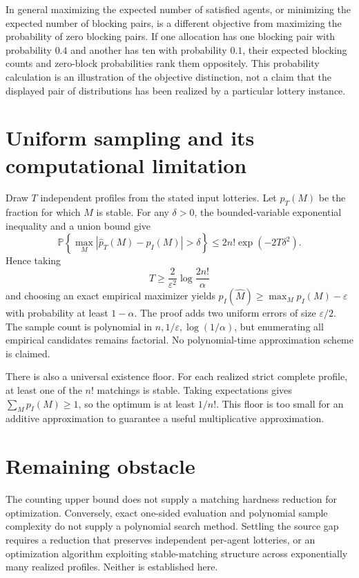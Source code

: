 \documentclass[11pt]{article}
\newcommand{\Prb}{\mathbb P}
\begin{document}
In general maximizing the expected number of satisfied agents, or minimizing the expected number of blocking pairs, is a different objective from maximizing the probability of zero blocking pairs. If one allocation has one blocking pair with probability $0.4$ and another has ten with probability $0.1$, their expected blocking counts and zero-block probabilities rank them oppositely. This probability calculation is an illustration of the objective distinction, not a claim that the displayed pair of distributions has been realized by a particular lottery instance.

\section*{Uniform sampling and its computational limitation}
Draw $T$ independent profiles from the stated input lotteries. Let $\widehat p_T(M)$ be the fraction for which $M$ is stable. For any $\delta>0$, the bounded-variable exponential inequality and a union bound give
\[
 \Prb\left\{\max_M|\widehat p_T(M)-p_I(M)|>\delta\right\}
 \leq2n!\exp(-2T\delta^2).
\]
Hence taking
\[
 T\geq \frac{2}{\varepsilon^2}\log\frac{2n!}{\alpha}
\]
and choosing an exact empirical maximizer yields $p_I(\widehat M)\geq\max_Mp_I(M)-\varepsilon$ with probability at least $1-\alpha$. The proof adds two uniform errors of size $\varepsilon/2$. The sample count is polynomial in $n,1/\varepsilon,\log(1/\alpha)$, but enumerating all empirical candidates remains factorial. No polynomial-time approximation scheme is claimed.

There is also a universal existence floor. For each realized strict complete profile, at least one of the $n!$ matchings is stable. Taking expectations gives $\sum_Mp_I(M)\geq1$, so the optimum is at least $1/n!$. This floor is too small for an additive approximation to guarantee a useful multiplicative approximation.

\section*{Remaining obstacle}
The counting upper bound does not supply a matching hardness reduction for optimization. Conversely, exact one-sided evaluation and polynomial sample complexity do not supply a polynomial search method. Settling the source gap requires a reduction that preserves independent per-agent lotteries, or an optimization algorithm exploiting stable-matching structure across exponentially many realized profiles. Neither is established here.
\end{document}
